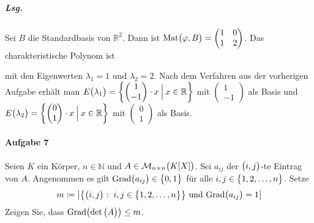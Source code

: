 \documentclass{scrreprt}
\newcommand{\Grad}{\text{Grad}}
\begin{document}
\begin{enumerate}[(i)]
  \subparagraph{Lsg.} Sei $B$ die Standardbasis von $\mathbb{R}^2$.
  Dann ist
  $\text{Mat}\qty\big(\varphi, B) = \begin{pmatrix}1&0\\1&2\end{pmatrix}$.
  Das charakteristische Polynom ist
  mit den Eigenwerten $\lambda_1 = 1$ und $\lambda_2 = 2$.
  Nach dem Verfahren aus der vorherigen Aufgabe erhält man
  $E\qty\big(\lambda_1) = \qty{
    \begin{pmatrix}
      1 \\
      -1 \\
    \end{pmatrix} \cdot x
    \:{\Big |}\:
    x \in \mathbb{R}
  }$ mit $\begin{pmatrix}1\\-1\end{pmatrix}$ als Basis und
  $E\qty\big(\lambda_2) = \qty{
    \begin{pmatrix}
      0 \\
      1 \\
    \end{pmatrix} \cdot x
    \:{\Big |}\:
    x \in \mathbb{R}
  }$ mit $\begin{pmatrix}0\\1\end{pmatrix}$ als Basis.
\end{enumerate}

\newpage
\paragraph{Aufgabe 7} Seien $K$ ein Körper, $n \in \mathbb{N}$
und $A \in \mathcal{M}_{n \times n}\qty\big(K[X])$.
Sei $a_{ij}$ der $\qty\big(i, j)$-te Eintrag von $A$.
Angenommen es gilt $\Grad\qty\big(a_{ij}) \in \qty\big{0, 1}$ für alle
$i, j \in \qty\big{1, 2, \ldots, n}$.
Setze
\[
  m \coloneqq \abs{\qty\big{
      \qty\big(i, j) \:\colon\: i, j \in \qty\big{1, 2, \ldots, n}
    } \text{ und } \Grad\qty\big(a_{ij}) = 1}
\]
Zeigen Sie, dass $\Grad\qty\big(\det\qty\big(A)) \leq m$.
\end{document}
